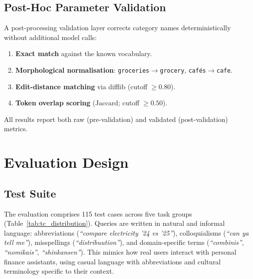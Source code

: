 \documentclass[11pt,twocolumn]{article}
\begin{document}
\subsection{Post-Hoc Parameter Validation}
\label{sec:validation}

A post-processing validation layer corrects category names
deterministically without additional model calls:

\begin{enumerate}
    \item \textbf{Exact match} against the known vocabulary.
    \item \textbf{Morphological normalisation}:
          \texttt{groceries}$\to$\texttt{grocery},
          \texttt{caf\'{e}s}$\to$\texttt{cafe}.
    \item \textbf{Edit-distance matching} via difflib
          (cutoff $\geq 0.80$).
    \item \textbf{Token overlap scoring} (Jaccard;
          cutoff $\geq 0.50$).
\end{enumerate}

All results report both raw (pre-validation) and validated
(post-validation) metrics.

\section{Evaluation Design}
\label{sec:evaluation}

\subsection{Test Suite}

The evaluation comprises 115 test cases across five task groups
(Table~\ref{tab:tc_distribution}).
Queries are written in natural and informal language: abbreviations
(\emph{``compare electricity '24 vs '25''}), colloquialisms
(\emph{``can ya tell me''}), misspellings (\emph{``distribuution''}),
and domain-specific terms (\emph{``combinis''}, \emph{``nomikais''},
\emph{``shinkansen''}).
This mimics how real users interact with personal finance
assistants, using casual language with abbreviations and
cultural terminology specific to their context.
\end{document}
